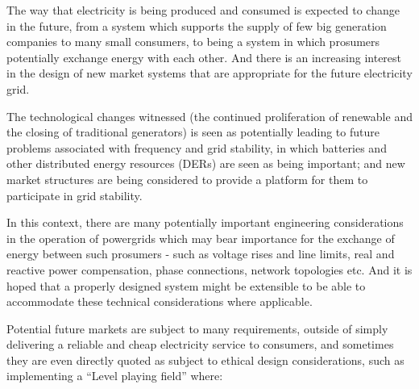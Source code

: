 






The way that electricity is being produced and consumed is expected to change in the future, from a system which supports the supply of few big generation companies to many small consumers, to being a system in which prosumers potentially exchange energy with each other.
And there is an increasing interest in the design of new market systems that are appropriate for the future electricity grid.

The technological changes witnessed (the continued proliferation of renewable and the closing of traditional generators) is seen as potentially leading to future problems associated with frequency and grid stability, in which batteries and other distributed energy resources (DERs) are seen as being important; and new market structures are being considered to provide a platform for them to participate in grid stability.

In this context, there are many potentially important engineering considerations in the operation of powergrids which may bear importance for the exchange of energy between such prosumers - such as voltage rises and line limits, real and reactive power compensation, phase connections, network topologies etc.
And it is hoped that a properly designed system might be extensible to be able to accommodate these technical considerations where applicable.

Potential future markets are subject to many requirements, outside of simply delivering a reliable and cheap electricity service to consumers, and sometimes they are even directly quoted as subject to ethical design considerations, such as implementing a ``Level playing field'' where:

